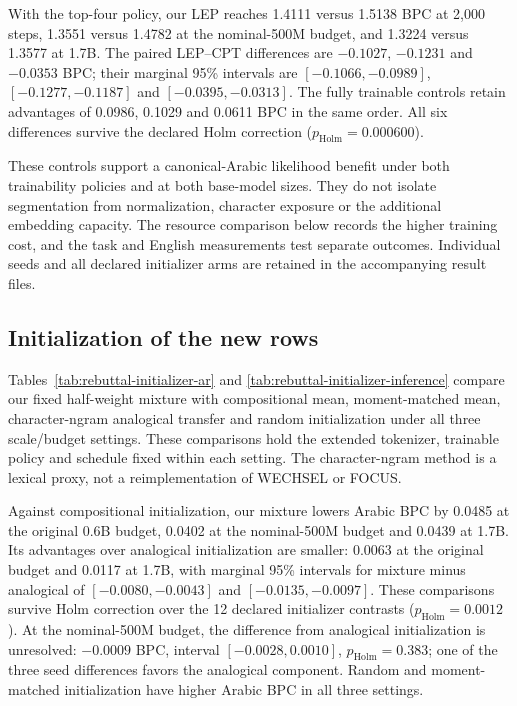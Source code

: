 \documentclass{ieeeaccess}
\begin{document}
With the top-four policy, our LEP reaches 1.4111 versus 1.5138 BPC at 2{,}000
steps, 1.3551 versus 1.4782 at the nominal-500M budget, and 1.3224 versus
1.3577 at 1.7B. The paired LEP--CPT differences are $-0.1027$, $-0.1231$
and $-0.0353$ BPC; their marginal 95\% intervals are
$[-0.1066,-0.0989]$, $[-0.1277,-0.1187]$ and $[-0.0395,-0.0313]$.
The fully trainable controls retain advantages of 0.0986, 0.1029 and
0.0611 BPC in the same order. All six differences survive the declared
Holm correction ($p_{\mathrm{Holm}}=0.000600$).

These controls support a canonical-Arabic likelihood benefit under both
trainability policies and at both base-model sizes. They do not isolate
segmentation from normalization, character exposure or the additional
embedding capacity. The resource comparison below records the higher
training cost, and the task and English measurements test separate
outcomes. Individual seeds and all declared initializer arms are retained
in the accompanying result files.




\subsection{Initialization of the new rows}
\label{sec:res_init}

Tables~\ref{tab:rebuttal-initializer-ar} and
\ref{tab:rebuttal-initializer-inference} compare our fixed half-weight mixture with compositional mean,
moment-matched mean, character-ngram analogical transfer and random
initialization under all three scale/budget settings. These comparisons
hold the extended tokenizer, trainable policy and schedule fixed within
each setting. The character-ngram method is a lexical proxy, not a
reimplementation of WECHSEL or FOCUS.

Against compositional initialization, our mixture lowers Arabic BPC by
0.0485 at the original 0.6B budget, 0.0402 at the nominal-500M budget and
0.0439 at 1.7B. Its advantages over analogical initialization are smaller:
0.0063 at the original budget and 0.0117 at 1.7B, with marginal 95\%
intervals for mixture minus analogical of $[-0.0080,-0.0043]$ and
$[-0.0135,-0.0097]$. These comparisons survive Holm correction over the
12 declared initializer contrasts ($p_{\mathrm{Holm}}=0.0012$).
At the nominal-500M budget, the difference from analogical initialization
is unresolved: $-0.0009$ BPC, interval $[-0.0028,0.0010]$,
$p_{\mathrm{Holm}}=0.383$; one of the three seed differences favors the
analogical component. Random and moment-matched initialization have
higher Arabic BPC in all three settings.
\end{document}
